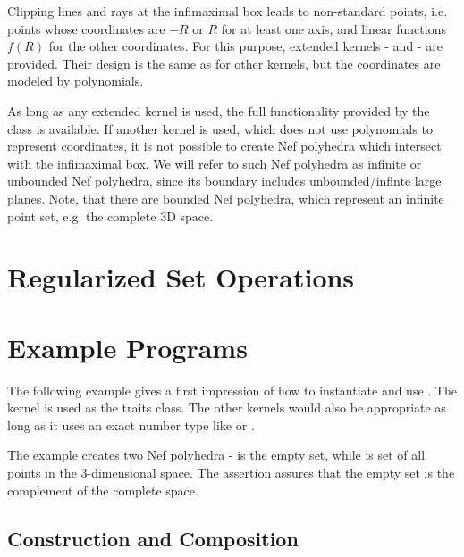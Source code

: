 Clipping lines and rays at the infimaximal box leads to non-standard points,
i.e. points whose coordinates are $-R$ or $R$ for at least one axis, and
linear functions $f(R)$ for the other coordinates. For this purpose, extended
kernels -  and  - are provided. Their
design is the same as for other \cgal kernels, but the coordinates are
modeled by polynomials.

As long as any extended kernel is used, the full functionality provided 
by the class  is available. If another kernel is
used, which does not use polynomials to represent coordinates, it is not
possible to create Nef polyhedra which intersect with the infimaximal box.
We will refer to such Nef polyhedra as infinite or unbounded Nef polyhedra, 
since its boundary includes unbounded/infinte large planes. Note, that
there are bounded Nef polyhedra, which represent an infinite
point set, e.g. the complete 3D space.

\section{Regularized Set Operations}



\section{Example Programs}

The following example gives a first impression of how to instantiate and use
. The \cgal kernel  is used as the traits
class. The other \cgal kernels would also be appropriate as long as it uses an
exact number type like  or . 

The example creates two Nef polyhedra -  is the empty set, while 
 is set of all points in the 3-dimensional space. The assertion assures
that the empty set is the complement of the complete space.


\subsection{Construction and Composition}

